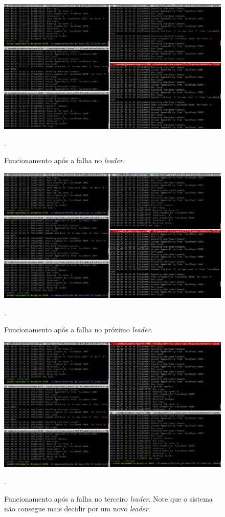 \documentclass[journal,onecolumn]{IEEEtran}
\begin{document}
\begin{figure}[H]
\centering
\centerline{\includegraphics[scale=0.4]{imagens/1_falha.png}}
\caption{Funcionamento após a falha no \textit{leader}.}.
\label{1_falha}
\end{figure}

\begin{figure}[H]
\centering
\centerline{\includegraphics[scale=0.4]{imagens/2_falhas.png}}
\caption{Funcionamento após a falha no próximo \textit{leader}.}.
\label{2_falhas}
\end{figure}

\begin{figure}[H]
\centering
\centerline{\includegraphics[scale=0.4]{imagens/3_falhas.png}}
\caption{Funcionamento após a falha no terceiro \textit{leader}. Note que o sistema não consegue mais decidir por um novo \textit{leader}.}.
\label{3_falhas}
\end{figure}
\end{document}
